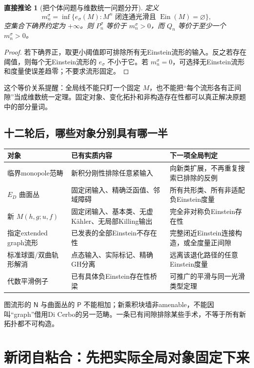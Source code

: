 \documentclass[UTF8,fontset=fandol,zihao=-4]{ctexart}
\theoremstyle{research}
\newtheorem{lemma}[sourceprop]{直接推论}
\begin{document}
\begin{lemma}[把个体问题与维数统一问题分开]
定义
\[
 m_n^\sigma=\inf\{e_\sigma(M):M^n\text{ 闭连通光滑且 }\operatorname{Ein}(M)=\varnothing\},
\]
空集合下确界约定为 $+\infty$。则 $P_n^\sigma$ 等价于 $m_n^\sigma>0$，而 $Q_n$ 等价于至少一个 $m_n^\sigma>0$。
\end{lemma}
\begin{proof}
若下确界正，取更小阈值即可排除所有无Einstein流形的输入。反之若存在阈值，则每个无Einstein流形的 $e_\sigma$ 不小于它。若 $m_n^\sigma=0$，可选择无Einstein流形和度量使误差趋零；不要求流形固定。
\end{proof}
这个等价关系提醒：全局线不能只盯一个固定 $M$，也不能把“每个流形各有正间隙”当成维数统一定理。固定对象、变化拓扑和非构造存在性都可以真正解决原题中的部分量词。

\subsection{十二轮后，哪些对象分别具有哪一半}
\begin{longtable}{P{.24\textwidth}P{.35\textwidth}P{.32\textwidth}}
\toprule 对象 & 已有实质内容 & 下一项全局判定\\\midrule\endhead
临界monopole范畴 & 新积分刚性排除任意紧输入 & 向新类扩展，不再重复搜索已排除的反例\\
$E_D$ 曲面丛 & 固定闭输入、精确泛函值、邻域障碍 & 所有共形类、所有非适配负Einstein度量\\
新 $M(h,g;u,f)$ & 固定闭输入、基本类、无虚Kähler、无局部Killing输出 & 完全非对称负Einstein存在性\\
指定extended graph流形 & 已发表的全部Einstein不存在性 & 完整闭近Einstein连接构造，或全度量正间隙\\
标准球面/双曲轨形解消 & 点态输入、实际标记、精确GH分离 & 远离该退化路径的任意Einstein度量\\
代数平滑例子 & 已有具体负Einstein存在性桥梁 & 可推广的平滑与同一光滑类型定理\\\bottomrule
\end{longtable}
图流形的 $\mathsf N$ 与曲面丛的 $\mathsf P$ 不能相加；新乘积块墙非amenable，不能因叫“graph”借用Di Cerbo的另一范畴\cite{DiCerbo}。一条已有间隙排除某些手术，不等于所有新拓扑都不可构造。

\section{新闭自粘合：先把实际全局对象固定下来}
\end{document}
